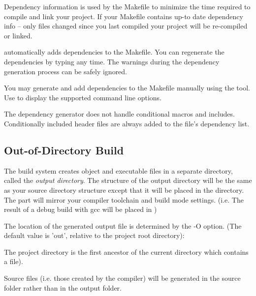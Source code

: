 Dependency information is used by the Makefile to minimize the time required to
compile and link your project. If your Makefile contains up-to date dependency info
-- only files changed since you last compiled your project will be re-compiled or linked.


 automatically adds dependencies to the Makefile.
You can regenerate the dependencies by typing  any time.
The warnings during the dependency generation process can be safely ignored.


You may generate and add dependencies to the Makefile manually using the 
tool. Use  to display the supported command line options.

\begin{note}
The dependency generator does not handle conditional macros and includes. Conditionally included header
files are always added to the file's dependency list.
\end{note}


\subsection{Out-of-Directory Build}
\label{sec:build-sim-progs:out-of-directory-build}

The build system creates object and executable files in a separate directory, called the
\textit{output directory}. The structure of the output directory will be the same as your
source directory structure except that it will be placed in the  directory.
The  part will mirror your compiler toolchain and build mode settings.
(i.e. The result of a debug build with gcc will be placed in )


The location of the generated output file is determined by the -O option.
(The default value is 'out', relative to the project root directory):




\begin{note}
The project directory is the first ancestor of the current directory which
contains a  file).
\end{note}


\begin{note}
Source files (i.e. those created by the  compiler) will be generated in the
source folder rather than in the output folder.
\end{note}


